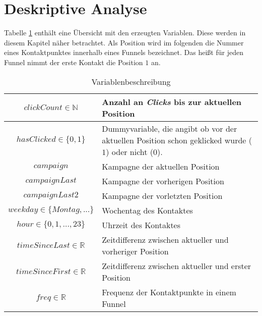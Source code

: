 \section{Deskriptive  Analyse}\label{descriptiv}

Tabelle \ref{varbeschreibung} enthält eine Übersicht mit den erzeugten Variablen. Diese werden in diesem Kapitel näher betrachtet. Als Position wird im folgenden die Nummer eines Kontaktpunktes innerhalb eines Funnels bezeichnet. Das heißt für jeden Funnel nimmt der erste Kontakt die Position $1$ an.
\begin{table}[H]
    \begin{center}
\begin{tabular}{|c|p{10cm}|}
		\hline $ clickCount \in \mathbb{N} $ & Anzahl an \textit{Clicks} bis zur aktuellen Position\\
    \hline $ hasClicked\in\{0,1\} $  & Dummyvariable, die angibt ob vor der aktuellen Position schon geklicked wurde ($1$) oder nicht ($0$). \\
		\hline $ campaign $ & Kampagne der aktuellen Position\\ 
    \hline $ campaignLast $ & Kampagne der vorherigen Position\\ 
    \hline $ campaignLast2 $  & Kampagne der vorletzten Position\\
    \hline $ weekday \in \{Montag,...\}$ & Wochentag des Kontaktes  \\
    \hline $ hour \in \{0,1,\dots, 23\} $  & Uhrzeit des Kontaktes \\
    \hline $ timeSinceLast \in \mathbb{R}$  & Zeitdifferenz zwischen aktueller und vorheriger Position\\
    \hline $ timeSinceFirst \in \mathbb{R} $ & Zeitdifferenz zwischen aktueller und erster Position\\
    \hline$ freq \in \mathbb{R} $ & Frequenz der Kontaktpunkte in einem Funnel\\
    \hline
\end{tabular} 
 \end{center}
 \caption{Variablenbeschreibung}\label{varbeschreibung}
\end{table}

